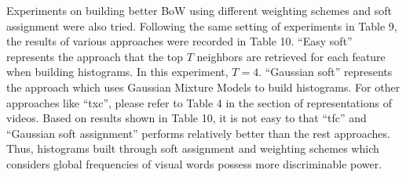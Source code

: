 \begin{table}[!ht]
  \begin{center}
    \end{center}
    \caption{Means and standard deviations (percent) of MAPs over six events using different mechanisms to build histograms}
\end{table}

\noindent Experiments on building better BoW using different weighting schemes and soft assignment were also tried. Following the same setting of experiments in Table 9, the results of various approaches were recorded in Table 10. ``Easy soft'' represents the approach that the top $T$ neighbors are retrieved for each feature when building histograms. In this experiment, $T = 4$. ``Gaussian soft'' represents the approach which uses Gaussian Mixture Models to build histograms. For other approaches like ``txc'', please refer to Table 4 in the section of representations of videos. Based on results shown in Table 10, it is not easy to that ``tfc'' and ``Gaussian soft assignment'' performs relatively better than the rest approaches. Thus, histograms built through soft assignment and weighting schemes which considers global frequencies of visual words possess more discriminable power. \\

